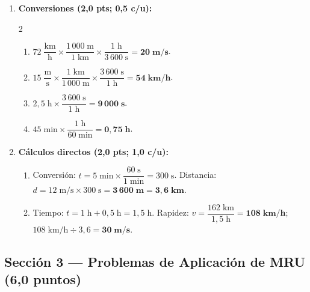 \documentclass[12pt, letterpaper]{article}
\begin{document}
\begin{enumerate}[leftmargin=*, label=\textbf{\arabic*.}, start=4, itemsep=0.35em]
  \item \textbf{Conversiones (2,0 pts; 0,5 c/u):}
        \begin{multicols}{2}
          \begin{enumerate}[label=\alph*), leftmargin=1.6em, itemsep=0.35em]
            \item $72\;\dfrac{\text{km}}{\text{h}} \times \dfrac{1\,000\;\text{m}}{1\;\text{km}} \times \dfrac{1\;\text{h}}{3\,600\;\text{s}} = \mathbf{20\;\text{m/s}}$.
            \item $15\;\dfrac{\text{m}}{\text{s}} \times \dfrac{1\;\text{km}}{1\,000\;\text{m}} \times \dfrac{3\,600\;\text{s}}{1\;\text{h}} = \mathbf{54\;\text{km/h}}$.
            \item $2{,}5\;\text{h} \times \dfrac{3\,600\;\text{s}}{1\;\text{h}} = \mathbf{9\,000\;\text{s}}$.
            \item $45\;\text{min} \times \dfrac{1\;\text{h}}{60\;\text{min}} = \mathbf{0{,}75\;\text{h}}$.
          \end{enumerate}
        \end{multicols}

  \item \textbf{Cálculos directos (2,0 pts; 1,0 c/u):}
        \begin{enumerate}[label=\alph*), leftmargin=1.6em, itemsep=0.25em]
          \item Conversión: $t = 5\;\text{min} \times \dfrac{60\;\text{s}}{1\;\text{min}} = 300\;\text{s}$. \quad
                Distancia: $d = 12\;\text{m/s} \times 300\;\text{s} = \mathbf{3\,600\;\text{m}} = \mathbf{3{,}6\;\text{km}}$.
          \item Tiempo: $t = 1\;\text{h} + 0{,}5\;\text{h} = 1{,}5\;\text{h}$. \quad
                Rapidez: $v = \dfrac{162\;\text{km}}{1{,}5\;\text{h}} = \mathbf{108\;\text{km/h}}$; \quad
                $108\;\text{km/h} \div 3{,}6 = \mathbf{30\;\text{m/s}}$.
        \end{enumerate}
\end{enumerate}

\subsection*{Sección 3 — Problemas de Aplicación de MRU (6,0 puntos)}
\end{document}
